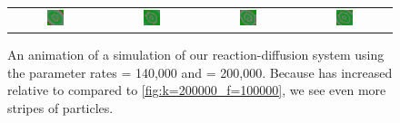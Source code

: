 \begin{figure}[h]
\begin{tabular}{c c c c}
\includegraphics[width = 0.19\textwidth]{../images/predator_prey_11_by_11_f_1.4_k_2_i4} & \includegraphics[width = 0.19\textwidth]{../images/../images/predator_prey_11_by_11_f_1.4_k_2_i5} & \includegraphics[width = 0.19\textwidth]{../images/../images/predator_prey_11_by_11_f_1.4_k_2_i6} & \includegraphics[width = 0.19\textwidth]{../images/../images/predator_prey_11_by_11_f_1.4_k_2_i7}
\end{tabular}
\caption{An animation of a simulation of our reaction-diffusion system using the parameter rates  = 140,000 and  = 200,000. Because  has increased relative to  compared to \autoref{fig:k=200000_f=100000}, we see even more stripes of  particles.}
\label{fig:k=200000_f=140000}
\end{figure}

